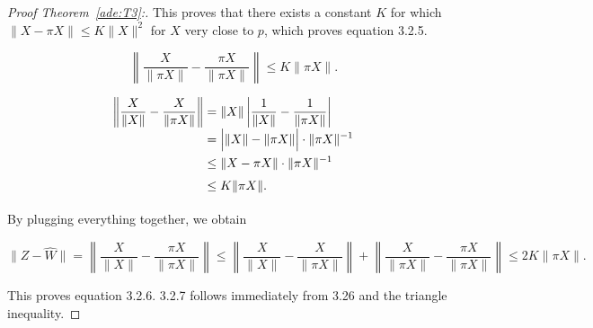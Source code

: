 \begin{proof}[Proof Theorem~\ref{ade:T3}:]
  This proves that there exists a constant $K$ for which $\|X - \pi X\| \leq K \|X\|^2$ for $X$ very close to $p$, which proves equation 3.2.5.


  \[ \left\| \frac{X}{\|\pi X\|} - \frac{\pi X}{\|\pi X\|} \right\| \leq K\|\pi X\|. \]
  
  \[ \everymath{\displaystyle}\arraycolsep=1.4pt\def\arraystretch{1.5}
  \begin{array}{rcl}
    \left\| \frac{X}{\|X\|} - \frac{X}{\|\pi X\|} \right\| & = & \|X\| \left| \frac{1}{\|X\|} - \frac{1}{\|\pi X\|} \right|\\
    & = & \Big|\|X\|- \|\pi X\|\Big| \cdot \|\pi X\|^{-1}\\
    & \leq & \|X-\pi X\|\cdot\|\pi X\|^{-1}\\
    & \leq & K \|\pi X\|.
  \end{array}
  \] 

  By plugging everything together, we obtain

  \[ \|Z - \widehat{W}\| = \left\|\frac{X}{\|X\|} - \frac{\pi X}{\|\pi X\|}\right\| \leq  {\left\| \frac{X}{\|X\|} - \frac{X}{\|\pi X\|} \right\|} + { \left\| \frac{X}{\|\pi X\|} - \frac{\pi X}{\|\pi X\|} \right\|} \leq 2 K \|\pi X\|.\] 

  This proves equation 3.2.6. 3.2.7 follows immediately from 3.26 and the triangle inequality.
  
\end{proof}

